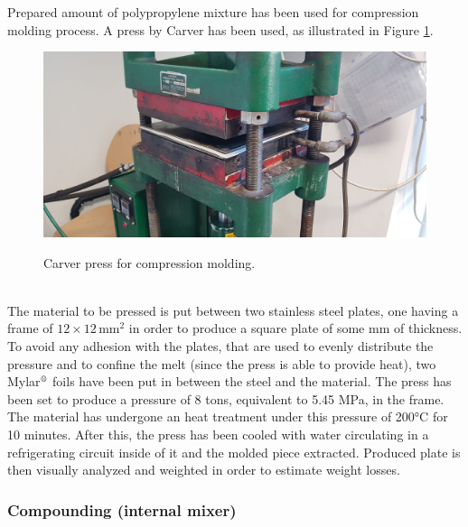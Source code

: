 \documentclass[a4paper, 11pt]{article}
\begin{document}
Prepared amount of polypropylene mixture has been used for compression molding process. A press by Carver has been used, as illustrated in Figure \ref{fig:press}. 
\begin{figure}[htp]
	\centering
	\includegraphics[scale=0.2]
	{PHOTO-2019-05-23-17-38-03.jpg}
	\label{fig:press}
	\caption{Carver press for compression molding.}
\end{figure}\\
The material to be pressed is put between two stainless steel plates, one having a frame of $12\times 12\, \text{mm}^2$ in order to produce a square plate of some mm of thickness. To avoid any adhesion with the plates, that are used to evenly distribute the pressure and to confine the melt (since the press is able to provide heat), two Mylar${^\text{\textregistered}}$ foils have been put in between the steel and the material. The press has been set to produce a pressure of 8 tons, equivalent to 5.45 MPa, in the frame. The material has undergone an heat treatment under this pressure of 200°C for 10 minutes. After this, the press has been cooled with water circulating in a refrigerating circuit inside of it and the molded piece extracted. Produced plate is then visually analyzed and weighted in order to estimate weight losses. \par 


\subsubsection{Compounding (internal mixer)}
\end{document}
